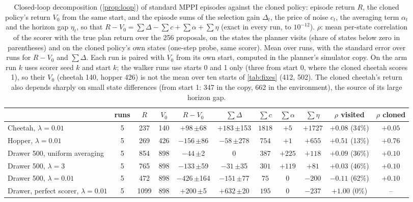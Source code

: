 \begin{table}[t]
\centering
\caption{Closed-loop decomposition (\cref{prop:loop}) of standard MPPI episodes against the cloned policy: episode return $R$, the cloned policy's return $V_0$ from the same start, and the episode sums of the selection gain $\Delta_t$, the price of noise $c_t$, the averaging term $\alpha_t$ and the horizon gap $\eta_t$, so that $R-V_0=\sum\Delta-\sum c+\sum\alpha+\sum\eta$ (exact in every run, to $10^{-12}$). $\rho$: mean per-state correlation of the scorer with the true plan return over the 256 proposals, on the states the planner visits (share of states below zero in parentheses) and on the cloned policy's own states (one-step probe, same scorer). Mean over runs, with the standard error over runs for $R-V_0$ and $\sum\Delta$. Each run is paired with $V_0$ from its own start, computed in the planner's simulator copy. On the arm run $k$ uses scorer seed $k$ and start $k$; the walker runs use starts 0 and 1 only (three from start 0, where the cloned cheetah scores 1), so their $V_0$ (cheetah 140, hopper 426) is not the mean over ten starts of \cref{tab:fixes} (412, 502). The cloned cheetah's return also depends sharply on small state differences (from start 1: 347 in the copy, 662 in the environment), the source of its large horizon gap.}
\label{tab:loop}
\small
\setlength{\tabcolsep}{4pt}
\begin{tabular}{lcccccccccc}
\toprule
& runs & $R$ & $V_0$ & $R-V_0$ & $\sum\Delta$ & $\sum c$ & $\sum\alpha$ & $\sum\eta$ & $\rho$ visited & $\rho$ cloned \\
\midrule
Cheetah, $\lambda=0.01$ & 5 & 237 & 140 & $+98$\,{\scriptsize$\pm$68} & $+183$\,{\scriptsize$\pm$153} & $1818$ & $+5$ & $+1727$ & $+0.08$ (34\%) & $+0.05$ \\
Hopper, $\lambda=0.01$ & 5 & 269 & 426 & $-156$\,{\scriptsize$\pm$86} & $-58$\,{\scriptsize$\pm$278} & $754$ & $+1$ & $+655$ & $+0.51$ (13\%) & $+0.76$ \\
Drawer 500, uniform averaging & 5 & 854 & 898 & $-44$\,{\scriptsize$\pm$2} & $0$ & $387$ & $+225$ & $+118$ & $+0.09$ (36\%) & $+0.10$ \\
Drawer 500, $\lambda=3$ & 5 & 765 & 898 & $-133$\,{\scriptsize$\pm$59} & $-31$\,{\scriptsize$\pm$35} & $301$ & $+119$ & $+81$ & $+0.03$ (46\%) & $+0.10$ \\
Drawer 500, $\lambda=0.01$ & 5 & 472 & 898 & $-426$\,{\scriptsize$\pm$164} & $-151$\,{\scriptsize$\pm$77} & $75$ & $0$ & $-200$ & $-0.11$ (62\%) & $+0.10$ \\
Drawer, perfect scorer, $\lambda=0.01$ & 5 & 1099 & 898 & $+200$\,{\scriptsize$\pm$5} & $+632$\,{\scriptsize$\pm$20} & $195$ & $0$ & $-237$ & $+1.00$ (0\%) & -- \\

\end{tabular}
\end{table}
